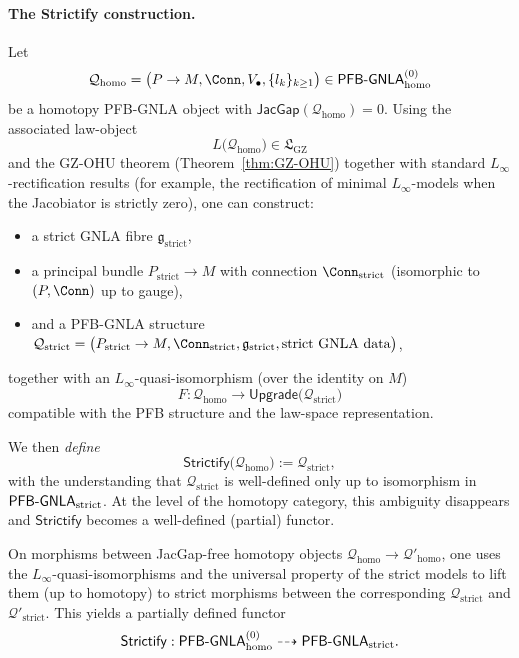 \documentclass[11pt]{book}
\theoremstyle{plain}
\theoremstyle{definition}
\newcommand{\GZLS}{\ensuremath{\mathfrak{L}_{\mathrm{GZ}}}}       \newcommand{\GZLT}{\ensuremath{M_{!w}}}                           \newcommand{\GZLOC}{\ensuremath{A_M}}                             \newcommand{\GZLCurv}{\ensuremath{\mathcal{F}_{\mathrm{law}}}}
\begin{document}
\paragraph{The Strictify construction.}
Let
\[
  \mathcal{Q}_{\mathrm{homo}}
  =
  \bigl(P\to M,\Conn,V_\bullet,\{l_k\}_{k\ge 1}\bigr)
  \in
  \mathsf{PFB\text- GNLA}_{\mathrm{homo}}^{(0)}
\]
be a homotopy PFB-GNLA object with \(\mathsf{JacGap}(\mathcal{Q}_{\mathrm{homo}})=0\).
Using the associated law-object
\[
  L\bigl(\mathcal{Q}_{\mathrm{homo}}\bigr)\in\GZLS
\]
and the GZ-OHU theorem (Theorem~\ref{thm:GZ-OHU}) together with
standard \(L_\infty\)-rectification results (for example, the
rectification of minimal \(L_\infty\)-models when the Jacobiator is
strictly zero), one can construct:
\begin{itemize}
  \item a strict GNLA fibre \(\mathfrak{g}_{\mathrm{strict}}\),
  \item a principal bundle \(P_{\mathrm{strict}}\to M\) with
        connection \(\Conn_{\mathrm{strict}}\) (isomorphic to
        \((P,\Conn)\) up to gauge),
  \item and a PFB-GNLA structure
        \(\mathcal{Q}_{\mathrm{strict}}=
         \bigl(P_{\mathrm{strict}}\to M,
               \Conn_{\mathrm{strict}},
               \mathfrak{g}_{\mathrm{strict}},
               \text{strict GNLA data}\bigr)\),
\end{itemize}
together with an \(L_\infty\)-quasi-isomorphism (over the identity on
\(M\))
\[
  F :
  \mathcal{Q}_{\mathrm{homo}}
  \longrightarrow
  \mathsf{Upgrade}\bigl(\mathcal{Q}_{\mathrm{strict}}\bigr)
\]
compatible with the PFB structure and the law-space representation.

We then \emph{define}
\[
  \mathsf{Strictify}\bigl(\mathcal{Q}_{\mathrm{homo}}\bigr)
  :=
  \mathcal{Q}_{\mathrm{strict}},
\]
with the understanding that \(\mathcal{Q}_{\mathrm{strict}}\) is
well-defined only up to isomorphism in
\(\mathsf{PFB\text- GNLA}_{\mathrm{strict}}\).  At the level of the
homotopy category, this ambiguity disappears and
\(\mathsf{Strictify}\) becomes a well-defined (partial) functor.

On morphisms between JacGap-free homotopy objects
\(\mathcal{Q}_{\mathrm{homo}}\to\mathcal{Q}'_{\mathrm{homo}}\), one
uses the \(L_\infty\)-quasi-isomorphisms and the universal property of
the strict models to lift them (up to homotopy) to strict morphisms
between the corresponding \(\mathcal{Q}_{\mathrm{strict}}\) and
\(\mathcal{Q}'_{\mathrm{strict}}\).  This yields a partially defined
functor
\[
  \mathsf{Strictify} :
  \mathsf{PFB\text- GNLA}_{\mathrm{homo}}^{(0)}
  \dashrightarrow
  \mathsf{PFB\text- GNLA}_{\mathrm{strict}}.
\]
\end{document}
